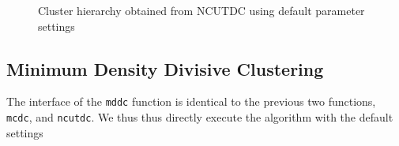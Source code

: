 \documentclass{book}
\begin{document}
\begin{figure}
\begin{htmlonly}
%
%
\end{htmlonly}
%
\caption{Cluster hierarchy obtained from NCUTDC using default parameter settings}
%
\label{fig:ncut1}
\end{figure}
%
%
%
%
%

\subsection{Minimum Density Divisive Clustering}

The interface of the {\tt mddc} function is
identical to the previous two functions, {\tt mcdc}, and {\tt ncutdc}.
%
We thus thus directly execute the algorithm with the
default settings 
\end{document}
